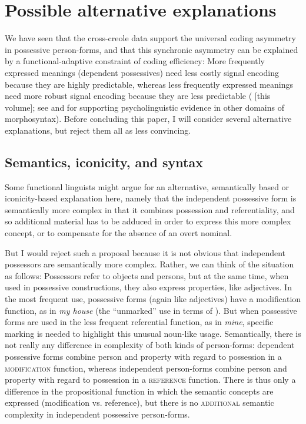 \documentclass[output=paper]{langsci/langscibook}
\begin{document}
\section{Possible alternative explanations}

We have seen that the cross-creole data support the universal coding asymmetry in possessive person-forms, and that this synchronic asymmetry can be explained by a functional-adaptive constraint of coding efficiency: More frequently expressed meanings (dependent possessives) need less costly signal encoding because they are highly predictable, whereas less frequently expressed meanings need more robust signal encoding because they are less predictable (\citealt{Haspelmath2018} [this volume]; see \citealt{NorcliffeJaeger2016} and \citealt{JaegerBuz2018} for supporting psycholinguistic evidence in other domains of morphosyntax). Before concluding this paper, I will consider several alternative explanations, but reject them all as less convincing.


\subsection{ Semantics, iconicity, and syntax}

Some functional linguists might argue for an alternative, semantically based or iconicity-based explanation here, namely that the independent possessive form is semantically more complex in that it combines possession and referentiality, and so additional material has to be adduced in order to express this more complex concept, or to compensate for the absence of an overt nominal. 

But I would reject such a proposal because it is not obvious that independent possessors are semantically more complex. Rather, we can think of the situation as follows: Possessors refer to objects and persons, but at the same time, when used in possessive constructions, they also express properties, like adjectives. In the most frequent use, possessive forms (again like adjectives) have a modification function, as in \textit{my house} (the “unmarked” use in terms of \citealt{Croft1991}). But when possessive forms are used in the less frequent referential function, as in \textit{mine}, specific marking is needed to highlight this unusual noun-like usage. Semantically, there is not really any difference in complexity of both kinds of person-forms: dependent possessive forms combine person and property with regard to possession in a \textsc{modification} function, whereas independent person-forms combine person and property with regard to possession in a \textsc{reference} function. There is thus only a difference in the propositional function in which the semantic concepts are expressed (modification vs. reference), but there is no \textsc{additional} semantic complexity in independent possessive person-forms. 
\end{document}

